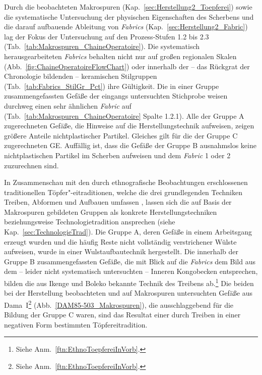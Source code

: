 \begin{multicols}{2}
\noindent Durch die beobachteten Makrospuren (Kap.~\ref{sec:Herstellung2_Toepferei}) sowie die systematische Untersuchung der physischen Eigenschaften des Scherbens und die darauf aufbauende Ableitung von \textit{Fabrics} (Kap.~\ref{sec:Herstellung2_Fabric}) lag der Fokus der Untersuchung auf den Prozess-Stufen 1.2 bis 2.3 (Tab.~\ref{tab:Makrospuren_ChaineOperatoire}). Die systematisch herausgearbeiteten \textit{Fabrics} behalten nicht nur auf großen regionalen Skalen (Abb.~\ref{fig:ChaineOperatoireFlowChart}) oder innerhalb der -- das Rückgrat der Chronologie bildenden -- keramischen Stilgruppen (Tab.~\ref{tab:Fabrics_StilGr_Pct}) ihre Gültigkeit. Die in einer Gruppe zusammengefassten Gefäße der eingangs untersuchten Stichprobe weisen durchweg einen sehr ähnlichen \textit{Fabric} auf (Tab.~\ref{tab:Makrospuren_ChaineOperatoire} Spalte 1.2.1). Alle der Gruppe A zugerechneten Gefäße, die Hinweise auf die Herstellungstechnik aufweisen, zeigen größere Anteile nichtplastischer Partikel. Gleiches gilt für die der Gruppe C zugerechneten GE. Auffällig ist, dass die Gefäße der Gruppe B ausnahmslos keine nichtplastischen Partikel im Scherben aufweisen und dem \textit{Fabric} 1 oder 2 zuzurechnen sind.  

In Zusammenschau mit den durch ethnografische Beobachtungen erschlossenen traditionellen Töpfer"-eitraditionen, welche die drei grundlegenden Techniken Treiben, Abformen und Aufbauen umfassen \parencite[44]{Drost.1967}, lassen sich die auf Basis der Makrospuren gebildeten Gruppen als konkrete Herstellungstechniken beziehungsweise Technologietradition ansprechen (siehe Kap.~\ref{sec:TechnologieTrad}). Die Gruppe A, deren Gefäße in einem Arbeitsgang erzeugt wurden und die häufig Reste nicht vollständig verstrichener Wülste aufweisen, wurde in einer Wulstaufbautechnik hergestellt. Die innerhalb der Gruppe B zusammengefassten Gefäße, die mit Blick auf die \textit{Fabrics} dem Bild aus dem -- leider nicht systematisch untersuchten -- Inneren Kongobecken entsprechen, bilden die aus Ikenge \parencites{Eggert.1980c}{Wotzka.1991} und Boleko bekannte Technik des Treibens ab.\footnote{Siehe Anm.~\ref{ftn:EthnoToepfereiInVorb}.} Die beiden bei der Herstellung beobachteten und auf Makrospuren untersuchten Gefäße aus Dama~I\footnote{Siehe Anm.~\ref{ftn:EthnoToepfereiInVorb}.} (Abb.~\ref{DAM85-503_Makrospuren}), die ausschlaggebend für die Bildung der Gruppe C waren, sind das Resultat einer durch Treiben in einer negativen Form bestimmten Töpfereitradition.


\end{multicols}
